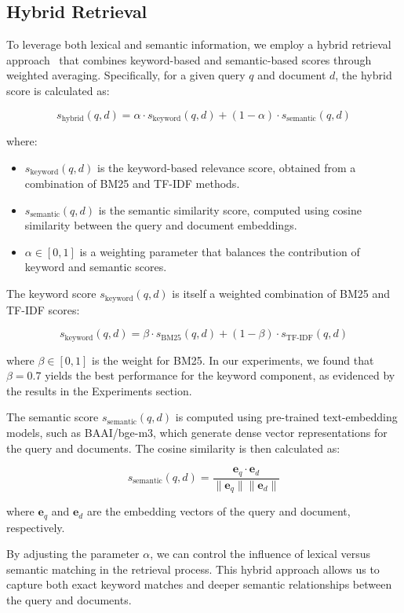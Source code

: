 \documentclass[twoside]{article}
\begin{document}
\subsection{Hybrid Retrieval}

To leverage both lexical and semantic information, we employ a hybrid retrieval approach~\cite{langchain2023hybrid} that combines keyword-based and semantic-based scores through weighted averaging. Specifically, for a given query \( q \) and document \( d \), the hybrid score is calculated as:

\[ s_{\text{hybrid}}(q, d) = \alpha \cdot s_{\text{keyword}}(q, d) + (1 - \alpha) \cdot s_{\text{semantic}}(q, d) \]

where:
\begin{itemize}
    \item \( s_{\text{keyword}}(q, d) \) is the keyword-based relevance score, obtained from a combination of BM25 and TF-IDF methods.
    \item \( s_{\text{semantic}}(q, d) \) is the semantic similarity score, computed using cosine similarity between the query and document embeddings.
    \item \( \alpha \in [0, 1] \) is a weighting parameter that balances the contribution of keyword and semantic scores.
\end{itemize}

The keyword score \( s_{\text{keyword}}(q, d) \) is itself a weighted combination of BM25 and TF-IDF scores:

\[ s_{\text{keyword}}(q, d) = \beta \cdot s_{\text{BM25}}(q, d) + (1 - \beta) \cdot s_{\text{TF-IDF}}(q, d) \]

where \( \beta \in [0, 1] \) is the weight for BM25. In our experiments, we found that \( \beta = 0.7 \) yields the best performance for the keyword component, as evidenced by the results in the Experiments section.

The semantic score \( s_{\text{semantic}}(q, d) \) is computed using pre-trained text-embedding models, such as BAAI/bge-m3, which generate dense vector representations for the query and documents. The cosine similarity is then calculated as:

\[ s_{\text{semantic}}(q, d) = \frac{\mathbf{e}_q \cdot \mathbf{e}_d}{\|\mathbf{e}_q\| \|\mathbf{e}_d\|} \]

where \( \mathbf{e}_q \) and \( \mathbf{e}_d \) are the embedding vectors of the query and document, respectively.

By adjusting the parameter \( \alpha \), we can control the influence of lexical versus semantic matching in the retrieval process. This hybrid approach allows us to capture both exact keyword matches and deeper semantic relationships between the query and documents.
\end{document}
